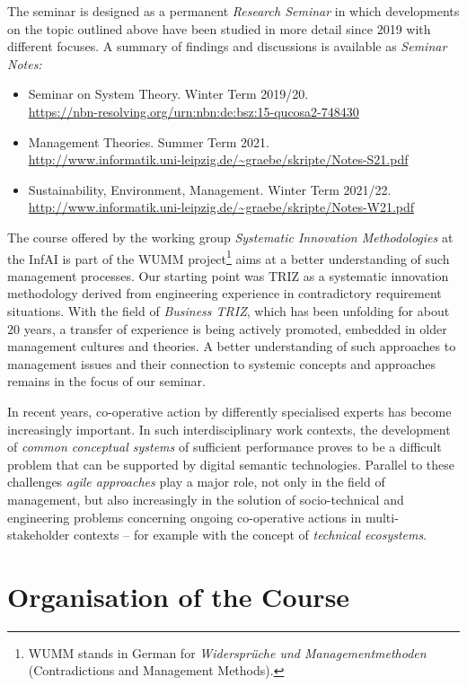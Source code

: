 \documentclass[11pt,a4paper]{article}
\begin{document}
The seminar is designed as a permanent \emph{Research Seminar} in which
developments on the topic outlined above have been studied in more detail
since 2019 with different focuses. A summary of findings and discussions is
available as \emph{Seminar Notes:}
\begin{itemize}
\item Seminar on System Theory. Winter Term 2019/20.\\
  \url{https://nbn-resolving.org/urn:nbn:de:bsz:15-qucosa2-748430} 
\item Management Theories. Summer Term 2021.\\
  \url{http://www.informatik.uni-leipzig.de/~graebe/skripte/Notes-S21.pdf}
\item Sustainability, Environment, Management. Winter Term 2021/22.\\
  \url{http://www.informatik.uni-leipzig.de/~graebe/skripte/Notes-W21.pdf}
\end{itemize}

The course offered by the working group \emph{Systematic Innovation
  Methodologies} at the InfAI is part of the WUMM project\footnote{WUMM stands
  in German for \emph{Widersprüche und Managementmethoden} (Contradictions and
  Management Methods).} aims at a better understanding of such management
processes. Our starting point was TRIZ as a systematic innovation methodology
derived from engineering experience in contradictory requirement situations.
With the field of \emph{Business TRIZ}, which has been unfolding for about 20
years, a transfer of experience is being actively promoted, embedded in older
management cultures and theories.  A better understanding of such approaches
to management issues and their connection to systemic concepts and approaches
remains in the focus of our seminar.

In recent years, co-operative action by differently specialised experts has
become increasingly important.  In such interdisciplinary work contexts, the
development of \emph{common conceptual systems} of sufficient performance
proves to be a difficult problem that can be supported by digital semantic
technologies.  Parallel to these challenges \emph{agile approaches} play a
major role, not only in the field of management, but also increasingly in the
solution of socio-technical and engineering problems concerning ongoing
co-operative actions in multi-stakeholder contexts -- for example with the
concept of \emph{technical ecosystems}.

\section{Organisation of the Course}
\end{document}
